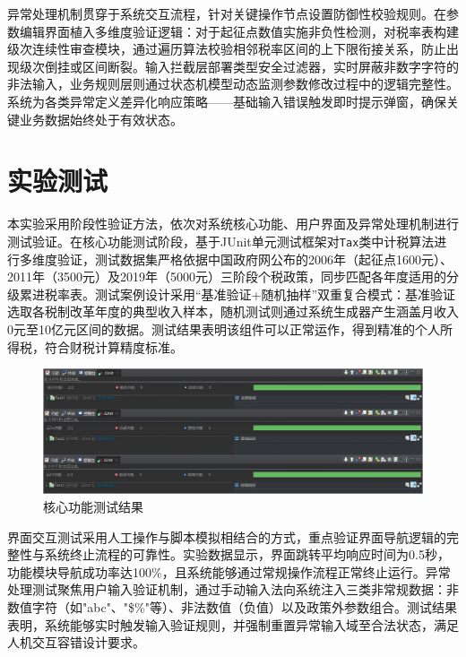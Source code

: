 \documentclass[a4paper, utf8]{ctexart}
\begin{document}
    异常处理机制贯穿于系统交互流程，针对关键操作节点设置防御性校验规则。在参数编辑界面植入多维度验证逻辑：对于起征点数值实施非负性检测，对税率表构建级次连续性审查模块，通过遍历算法校验相邻税率区间的上下限衔接关系，防止出现级次倒挂或区间断裂。输入拦截层部署类型安全过滤器，实时屏蔽非数字字符的非法输入，业务规则层则通过状态机模型动态监测参数修改过程中的逻辑完整性。系统为各类异常定义差异化响应策略——基础输入错误触发即时提示弹窗，确保关键业务数据始终处于有效状态。

    \section{实验测试}

    本实验采用阶段性验证方法，依次对系统核心功能、用户界面及异常处理机制进行测试验证。在核心功能测试阶段，基于JUnit单元测试框架对\verb|Tax|类中计税算法进行多维度验证，测试数据集严格依据中国政府网公布的2006年（起征点1600元）、2011年（3500元）及2019年（5000元）三阶段个税政策，同步匹配各年度适用的分级累进税率表。测试案例设计采用“基准验证+随机抽样”双重复合模式：基准验证选取各税制改革年度的典型收入样本，随机测试则通过系统生成器产生涵盖月收入0元至10亿元区间的数据。测试结果表明该组件可以正常运作，得到精准的个人所得税，符合财税计算精度标准。

    \begin{figure}[htbp]
        \centering
        \includegraphics[width=.9\linewidth]{./figure/Functiontest.png}
        \caption{核心功能测试结果}
    \end{figure}

    界面交互测试采用人工操作与脚本模拟相结合的方式，重点验证界面导航逻辑的完整性与系统终止流程的可靠性。实验数据显示，界面跳转平均响应时间为0.5秒，功能模块导航成功率达100\%，且系统能够通过常规操作流程正常终止运行。异常处理测试聚焦用户输入验证机制，通过手动输入法向系统注入三类非常规数据：非数值字符（如"abc"、"\$\%"等）、非法数值（负值）以及政策外参数组合。测试结果表明，系统能够实时触发输入验证规则，并强制重置异常输入域至合法状态，满足人机交互容错设计要求。
\end{document}
